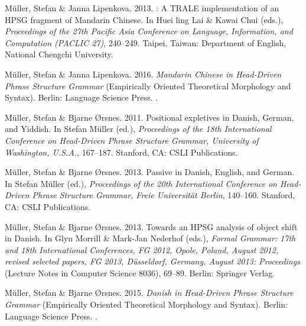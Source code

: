\begin{thebibliography}{1420}
M{\"u}ller, Stefan \& Janna Lipenkova. 2013.
: {A TRALE} implementation of an {HPSG} fragment of
  {Mandarin Chinese}.
\newblock In Huei ling Lai \& Kawai Chui (eds.), \emph{Proceedings of the {27th
  Pacific Asia Conference on Language, Information, and Computation} ({PACLIC}
  27)}, 240--249. Taipei, Taiwan: Department of English, National Chengchi
  University.

M{\"u}ller, Stefan \& Janna Lipenkova. 2016.
\newblock \emph{{Mandarin Chinese} in {Head-Driven Phrase Structure Grammar}}
  (Empirically Oriented Theoretical Morphology and Syntax).
\newblock Berlin: Language Science Press.
\newblock \inPreparation.

M{\"u}ller, Stefan \& Bjarne {}{\O}rsnes. 2011.
\newblock Positional expletives in {Danish}, {German}, and {Yiddish}.
\newblock In Stefan M{\"u}ller (ed.), \emph{Proceedings of the {18th
  International Conference on Head-Driven Phrase Structure Grammar, University
  of Washington, U.S.A.}}, 167--187. Stanford, CA: CSLI Publications.

M{\"u}ller, Stefan \& Bjarne {}{\O}rsnes. 2013{}.
\newblock Passive in {Danish}, {English}, and {German}.
\newblock In Stefan M{\"u}ller (ed.), \emph{Proceedings of the {20th
  International Conference on Head-Driven Phrase Structure Grammar, Freie
  Universit{\"a}t Berlin}}, 140--160. Stanford, CA: CSLI Publications.

M{\"u}ller, Stefan \& Bjarne {}{\O}rsnes. 2013{}.
\newblock Towards an {HPSG} analysis of object shift in {Danish}.
\newblock In Glyn Morrill \& Mark-Jan Nederhof (eds.), \emph{{Formal Grammar:
  17th and 18th International Conferences, FG 2012, Opole, Poland, August
  2012}, revised selected papers, {FG 2013, D{\"u}sseldorf, Germany, August}
  2013: {Proceedings}} (Lecture Notes in Computer Science 8036), 69--89.
  Berlin: Springer Verlag.

M{\"u}ller, Stefan \& Bjarne {}{\O}rsnes. 2015.
\newblock \emph{{Danish in Head-Driven Phrase Structure Grammar}}  (Empirically
  Oriented Theoretical Morphology and Syntax).
\newblock Berlin: Language Science Press.
\newblock \inPreparation.


\end{thebibliography}
